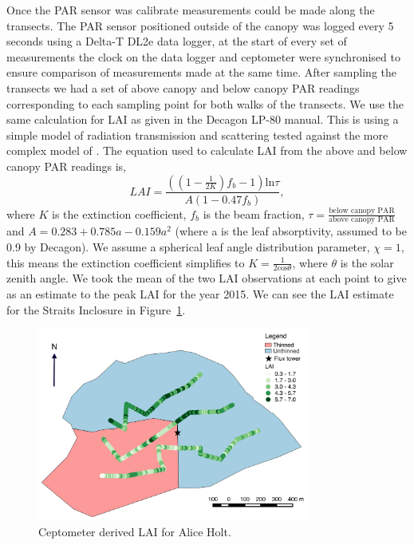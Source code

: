 Once the PAR sensor was calibrate measurements could be made along the transects. The PAR sensor positioned outside of the canopy was logged every 5 seconds using a Delta-T DL2e data logger, at the start of every set of measurements the clock on the data logger and ceptometer were synchronised to ensure comparison of measurements made at the same time. After sampling the transects we had a set of above canopy and below canopy PAR readings corresponding to each sampling point for both walks of the transects. We use the same calculation for LAI as given in the Decagon LP-80 manual. This is using a simple model of radiation transmission and scattering tested against the more complex model of \citet{norman1975photosynthesis}. The equation used to calculate LAI from the above and below canopy PAR readings is,
\begin{equation}
LAI = \frac{((1-\frac{1}{2K})f_b - 1)\text{ln}\tau}{A(1-0.47f_b)},
\end{equation} 
where \(K\) is the extinction coefficient, \(f_b\) is the beam fraction, \(\tau = \frac{\text{below canopy PAR}}{\text{above canopy PAR}}\) and \(A = 0.283 + 0.785a - 0.159 a^2\) (where a is the leaf absorptivity, assumed to be 0.9 by Decagon). We assume a spherical leaf angle distribution parameter, \(\chi = 1\), this means the extinction coefficient simplifies to \(K=\frac{1}{2\text{cos}\theta}\), where \(\theta\) is the solar zenith angle. We took the mean of the two LAI observations at each point to give as an estimate to the peak LAI for the year 2015. We can see the LAI estimate for the Straits Inclosure in Figure~\ref{chap4:fig:cept_lai}. 

\begin{figure}[ht]
    \centering
    \includegraphics[width=0.8\textwidth]{chapter/chapter4/lai_cept.pdf}
    \caption{Ceptometer derived LAI for Alice Holt.} \label{chap4:fig:cept_lai}
\end{figure}

